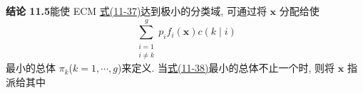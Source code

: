 \noindent\textbf{结论 11.5}\quad 能使 ECM \hyperref[eq:11-37]{式(11-37)}达到极小的分类域, 可通过将 $\mathbf{x}$ 分配给使
\label{eq:11-38}
\begin{equation}
\sum_{\substack{i=1\\i\ne k}}^{g}p_if_i(\mathbf{x})c(k\mid i)
\tag{11-38}
\end{equation}
最小的总体 $\pi_k$($k=1,\cdots,g$)来定义. 当\hyperref[eq:11-38]{式(11-38)}最小的总体不止一个时, 则将 $\mathbf{x}$ 指派给其中
